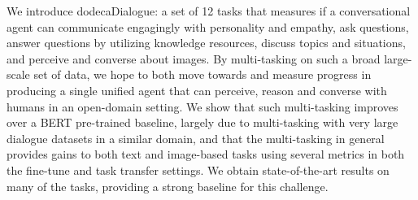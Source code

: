 We introduce dodecaDialogue: a set of 12 tasks that measures if a conversational agent can communicate engagingly with personality and empathy, ask questions, answer questions by utilizing knowledge resources, discuss topics and situations, and perceive and converse about images. By multi-tasking on such a broad large-scale set of data, we hope to both move towards and measure progress in producing a single unified agent that can perceive, reason and converse with humans in an open-domain setting. We show that such multi-tasking improves over a BERT pre-trained baseline, largely due to multi-tasking with very large dialogue datasets in a similar domain, and that the multi-tasking in general provides gains to both text and image-based tasks using several metrics in both the fine-tune and task transfer settings. We obtain state-of-the-art results on many of the tasks, providing a strong baseline for this challenge.
